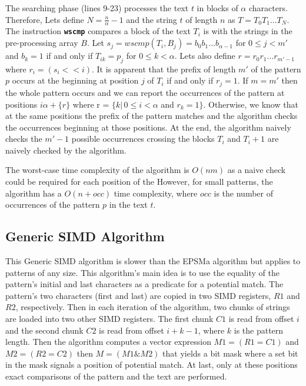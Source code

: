 The searching phase (lines 9-23) processes the text $t$ in blocks of $\alpha$ characters. Therefore, Lets define  $N = \frac{n}{\alpha} - 1$ and the string $t$ of length $n$ as $T=T_0 T_1...T_N$. The instruction \texttt{\textbf{wscmp}} compares a block of the text $T_i$ is with the strings in the pre-processing array $B$. Let $s_j = wscmp(T_i, B_j) = b_0 b_1 ...b_{\alpha-1}$ for $0 \leq j < m'$ and $b_k = 1$ if and only if $T_{ik} = p_j$ for $0 \leq k < \alpha$. Lets also define $r = r_0 r_1...r_{m'-1}$ where $r_i = (s_i << i)$. It is apparent that the prefix of length $m'$ of the pattern $p$
occurs at the beginning at position $j$ of $T_i$ if and only if $r_j = 1$. If $m = m'$ then the whole pattern occurs and we can report the occurrences of the pattern at positions $i\alpha + \{r\}$ where r = $\{k | \, 0 \leq i < \alpha$ and $r_k = 1\}$. Otherwise, we know that at the same positions the prefix of the pattern matches and the algorithm checks the occurrences beginning at those positions. At the end, the algorithm naively checks the $m' - 1$ possible occurrences crossing the blocks $T_i$ and $T_i+1$ are naively checked by the algorithm.

The worst-case time complexity of the algorithm is $O(nm)$ as a naive check could be required for each position of the  However, for small patterns, the algorithm has a $O(n+occ)$ time complexity, where $occ$ is the number of occurrences of the pattern $p$ in the text $t$.

\subsection{Generic SIMD Algorithm}
This Generic SIMD algorithm \cite{simdalgo} is slower than the EPSMa algorithm but applies to patterns of any size. This algorithm's main idea is to use the equality of the pattern's initial and last characters as a predicate for a potential match. The pattern's two characters (first and last) are copied in two SIMD registers, $R1$ and $R2$, respectively. Then in each iteration of the algorithm, two chunks of strings are loaded into two other SIMD registers. The first chunk $C1$ is read from offset $i$ and the second chunk $C2$ is read from offset $i + k - 1$, where $k$ is the pattern length. Then the algorithm computes a vector expression $M1 = (R1 = C1)$ and $M2 = (R2 = C2)$ then $M = (M1 \& M2)$ that yields a bit mask where a set bit in the mask signals a position of potential match. At last, only at these positions exact comparisons of the pattern and the text are performed.

